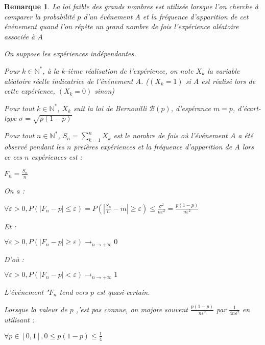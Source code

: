 \documentclass[a4paper,12pt]{book}
\newtheorem{Rem}{Remarque}[section]
\def\N{\mathbb{N}}
\begin{document}
\begin{Rem}
La loi faible des grands nombres est utilisée lorsque l'on cherche à comparer la probabilité $p$ d'un événement $A$ et la fréquence d'apparition de cet événement quand l'on répète un grand nombre de fois l'expérience aléatoire associée à $A$
\par On suppose les expériences indépendantes.
\par Pour $k\in\N^*$, à la $k$-ième réalisation de l'expérience, on note $X_k$ la variable aléatoire réelle indicatrice de l'événement $A$. ($(X_k=1)$ si $A$ est réalisé lors de cette expérience, $(X_k=0)$ sinon)
\par Pour tout $k\in\N^*$, $X_k$ suit la loi de Bernouilli $\mathcal{B}(p)$, d'espérance $m=p$, d'écart-type $\sigma =\sqrt{p(1-p)}$
\par Pour tout $n\in\N^*$, $S_n=\sum\limits_{k=1}^nX_k$ est le nombre de fois où l'événement $A$ a été observé pendant les $n$ preières expériences et la fréquence d'apparition de $A$ lors ce ces $n$ expériences est :
\par\begin{center}$F_n = \frac{S_n}{n}$\end{center}
\par On a : \par\begin{center}$\forall \varepsilon>0, P(\vert F_n-p\vert\leq \varepsilon)=P\left(\left\vert\frac{S_n}{n}-m\right\vert\geq \varepsilon\right)\leq \frac{\sigma^2}{n\varepsilon^2}=\frac{p(1-p)}{n\varepsilon^2}$\end{center}
\par Et : \par\begin{center}$\forall \varepsilon>0, P(\vert F_n-p\vert\geq\varepsilon)\to_{n\to+\infty}0$\end{center}
\par D'où : \par\begin{center}$\forall \varepsilon>0, P(\vert F_n-p\vert <\varepsilon)\to_{n\to+\infty}1$\end{center}
\par L'événement "$F_n$ tend vers $p$ est quasi-certain.
\par Lorsque la valeur de $p$ ,'est pas connue, on majore souvent $\frac{p(1-p)}{n\varepsilon^2}$ par $\frac{1}{4n\varepsilon^2}$ en utilisant :
\par\begin{center}$\boxed{\forall p\in [0,1], 0\leq p(1-p)\leq \frac{1}{4}}$
\end{center}
\end{Rem}
\end{document}
